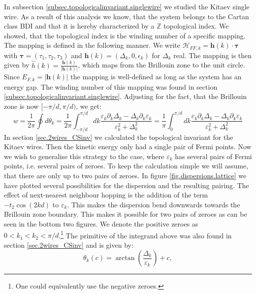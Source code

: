 In subsection \ref{subsec.topologicalinvariant.singlewire} we studied the Kitaev single wire. As a result of this analysis we know, that the system belongs to the Cartan class BDI and that it is hereby characterized by a $\mathbb{Z}$ topological index. We showed, that the topological index is the winding number of a specific mapping. The mapping is defined in the following manner. We write $\mathcal{H}_{FF,k} = \mathbf{h}(k)\cdot \boldsymbol\tau$ with $\boldsymbol\tau = (\tau_1, \tau_2, \tau_3)$ and $\mathbf{h}(k) = (\Delta_k, 0, \epsilon_k)$ for $\Delta_k$ real. The mapping is then given by $\hat{h}(k) = \frac{\mathbf{h}(k)}{|\mathbf{h}(k)|}$, which maps from the Brillouin zone to the unit circle. Since $E_{F,k} = |\mathbf{h}(k)|$ the mapping is well-defined as long as the system has an energy gap. The winding number of this mapping was found in section \ref{subsec.topologicalinvariant.singlewire}. Adjusting for the fact, that the Brillouin zone is now $[-\pi/d, \pi/d)$, we get:
\begin{equation}
w = \frac{1}{2\pi}\oint d\theta_k = \frac{1}{2\pi}\int_{-\pi/d}^{\pi/d} dk \frac{\varepsilon_k\partial_k\Delta_k - \Delta_k\partial_k\varepsilon_k}{\varepsilon^2_k + \Delta^2_k} = \frac{1}{\pi}\int_{0}^{\pi/d} dk \frac{\varepsilon_k\partial_k\Delta_k - \Delta_k\partial_k\varepsilon_k}{\varepsilon^2_k + \Delta^2_k}
\label{eq.windingnumber.kitaevmodel}
\end{equation} 
In section \ref{sec.2wires_CSinv} we calculated the topological invariant for the Kitaev wires. Then the kinetic energy only had a single pair of Fermi points. Now we wish to generalise this strategy to the case, where $\varepsilon_k$ has several pairs of Fermi points, i.e. several pairs of zeroes. To keep the calculation simple we will assume, that there are only up to two pairs of zeroes. In figure \ref{fig.dispersions.lattice} we have plotted several possibilities for the dispersion and the resulting pairing. The effect of next-nearest neighbour hopping is the addition of the term $-t_2\cos(2kd)$ to $\varepsilon_k$. This makes the dispersion bend downwards towards the Brillouin zone boundary. This makes it possible for two pairs of zeroes as can be seen in the bottom two figures. We denote the positive zeroes as $0 < k_1 < k_2 < \pi / d$.\footnote{One could equivalently use the negative zeroes.} The primitive of the integrand above was also found in section \ref{sec.2wires_CSinv} and is given by:
\begin{equation}
\theta_k(c) = \arctan\left(\frac{\Delta_k}{\varepsilon_k}\right) + c, \nonumber
\end{equation}

